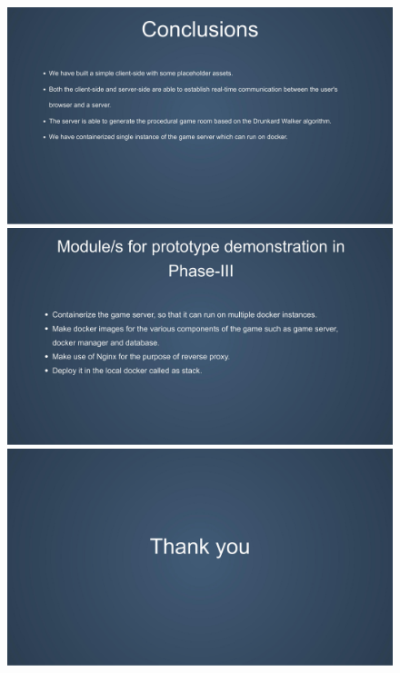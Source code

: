 \documentclass[oneside,12pt]{Classes/VTU}
\begin{document}
	\pagebreak
	\begin{figure}[ht!]
		\centering
		\includegraphics[scale=0.3]{0007.jpg}
		\includegraphics[scale=0.3]{0008.jpg}
		\includegraphics[scale=0.3]{0009.jpg}
	\end{figure}
	\pagebreak	
	\pagebreak
	
	
\end{document}
